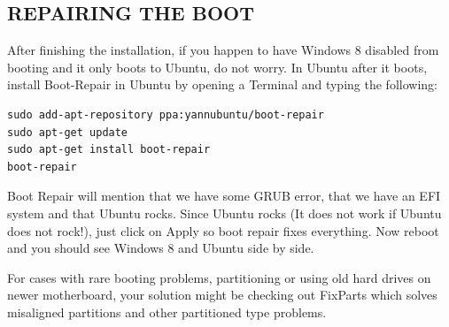 \documentclass{../guide}
\begin{document}
\subsection{REPAIRING THE BOOT}
After finishing the installation, if you happen to have Windows 8 disabled from booting and it only boots to Ubuntu, do not worry. In Ubuntu after it boots, install Boot-Repair in Ubuntu by opening a Terminal and typing the following:

\begin{verbatim}
sudo add-apt-repository ppa:yannubuntu/boot-repair
sudo apt-get update
sudo apt-get install boot-repair
boot-repair
\end{verbatim}
Boot Repair will mention that we have some GRUB error, that we have an EFI system and that Ubuntu rocks. Since Ubuntu rocks (It does not work if Ubuntu does not rock!), just click on Apply so boot repair fixes everything. Now reboot and you should see Windows 8 and Ubuntu side by side.

For cases with rare booting problems, partitioning or using old hard drives on newer motherboard, your solution might be checking out FixParts which solves misaligned partitions and other partitioned type problems.
\end{document}
